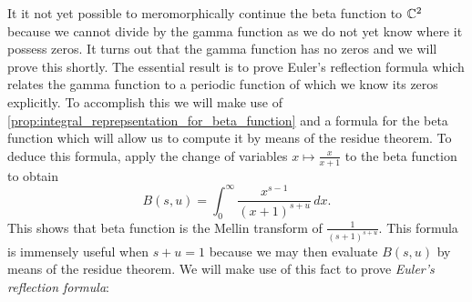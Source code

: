\documentclass[12pt]{article}
\begin{document}
    It it not yet possible to meromorphically continue the beta function to \(\mathbb{C}^{2}\) because we cannot divide by the gamma function as we do not yet know where it possess zeros. It turns out that the gamma function has no zeros and we will prove this shortly. The essential result is to prove Euler's reflection formula which relates the gamma function to a periodic function of which we know its zeros explicitly. To accomplish this we will make use of \cref{prop:integral_reprepsentation_for_beta_function} and a formula for the beta function which will allow us to compute it by means of the residue theorem. To deduce this formula, apply the change of variables \(x \mapsto \frac{x}{x+1}\) to the beta function to obtain
    \begin{equation}\label{equ:residue_form_beta_function}
      B(s,u) = \int_{0}^{\infty}\frac{x^{s-1}}{(x+1)^{s+u}}\,dx.
    \end{equation}
    This shows that beta function is the Mellin transform of \(\frac{1}{(s+1)^{s+u}}\). This formula is immensely useful when \(s+u = 1\) because we may then evaluate \(B(s,u)\) by means of the residue theorem. We will make use of this fact to prove \textit{Euler's reflection formula}:
\end{document}
